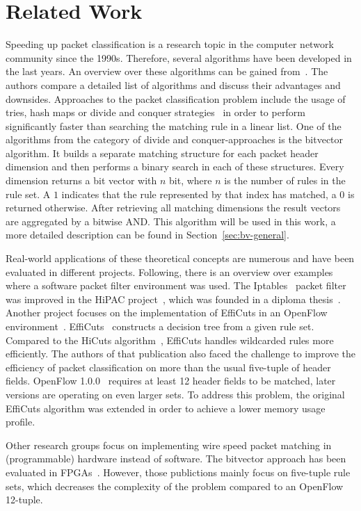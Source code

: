 \documentclass[a4paper,
		12pt,
		parskip=full,
		titlepage
		]{scrartcl}
\begin{document}
\section{Related Work}
Speeding up packet classification is a research topic in the computer network community since the 1990s.
Therefore, several algorithms have been developed in the last years.
An overview over these algorithms can be gained from~\cite{algorithms_survey}.
The authors compare a detailed list of algorithms and discuss their advantages and downsides.
Approaches to the packet classification problem include the usage of tries, 
hash maps or divide and conquer strategies~\cite{hicuts, efficuts} in order to perform significantly 
faster than searching the matching rule in a linear list.
One of the algorithms from the category of divide and conquer-approaches is the bitvector~\cite{bv} algorithm.
It builds a separate matching structure for each packet header dimension and 
then performs a binary search in each of these structures.
Every dimension returns a bit vector with $n$ bit, where $n$ is the number of rules in the rule set.
A $1$ indicates that the rule represented by that index has matched, a $0$ is returned otherwise.
After retrieving all matching dimensions the result vectors are aggregated by a bitwise AND.
This algorithm will be used in this work, a more detailed description can be found in Section~\ref{sec:bv-general}.

Real-world applications of these theoretical concepts are numerous and have been evaluated in different projects.
Following, there is an overview over examples where a software packet filter environment was used.
The Iptables~\cite{iptables} packet filter was improved in the HiPAC project~\cite{hipac}, 
which was founded in a diploma thesis~\cite{heinzhigh}. %
Another project focuses on the implementation of EffiCuts in an OpenFlow environment~\cite{stimpfling2013optimal}.
EffiCuts~\cite{efficuts} constructs a decision tree from a given rule set.
Compared to the HiCuts algorithm~\cite{hicuts}, EffiCuts handles wildcarded rules more efficiently.
The authors of that publication also faced the challenge to improve the efficiency 
of packet classification on more than the usual five-tuple of header fields.
OpenFlow 1.0.0~\cite{openflow_spec10} requires at least 12 header fields to be matched, later versions are operating on even larger sets.
To address this problem, the original EffiCuts algorithm was extended in order to achieve a lower memory usage profile.

Other research groups focus on implementing wire speed packet matching in (programmable) hardware instead of software.
The bitvector approach has been evaluated in FPGAs~\cite{bitvector_fpga, qu2013fast}.
However, those publictions mainly focus on five-tuple rule sets, which decreases 
the complexity of the problem compared to an OpenFlow 12-tuple.
\end{document}
